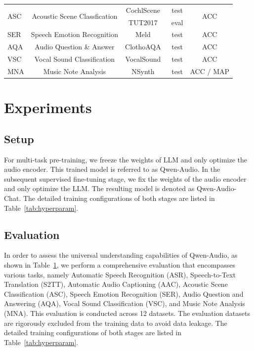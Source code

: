 \documentclass{article}
\begin{document}
\begin{table}[t!]
{\begin{tabular}{lcccc}
\midrule
\multirow{2}{*}{ASC} & \multirow{2}{*}{Acoustic Scene Classfication} & CochlScene~\citep{cochlscene}  &     test        & \multirow{2}{*}{ACC}                    \\
                     &                                               & TUT2017~\citep{TUT2017}     &    eval         &                                         \\\midrule
SER                  & Speech Emotion Recognition                    & Meld~\citep{Meld}        &      test       & ACC                                     \\\midrule
AQA                  & Audio Question \& Answer                      & ClothoAQA~\citep{ClothoAQA}   &     test        & ACC                                     \\\midrule
VSC                  & Vocal Sound Classification                     & VocalSound~\citep{VocalSound}  &    test         & ACC                                     \\\midrule
MNA                  & Music Note Analysis                           & NSynth~\citep{NSynth}      &       test      & ACC / MAP                      \\\bottomrule         
\end{tabular}
}
\label{tab:evaluation}
\end{table}


\section{Experiments}
\label{sec:experiments}
\subsection{Setup}
For multi-task pre-training, we freeze the weights of LLM and only optimize the audio encoder. This trained model is referred to as Qwen-Audio. In the subsequent supervised fine-tuning stage, we fix the weights of the audio encoder and only optimize the LLM. The resulting model is denoted as Qwen-Audio-Chat. The detailed training configurations of both stages are listed in Table~\ref{tab:hyperparam}.


\subsection{Evaluation}

In order to assess the universal understanding capabilities of Qwen-Audio, as shown in Table~\ref{tab:evaluation}, we perform a comprehensive evaluation that encompasses various tasks, namely Automatic Speech Recognition (ASR), Speech-to-Text Translation (S2TT), Automatic Audio Captioning (AAC), Acoustic Scene Classification (ASC), Speech Emotion Recognition (SER), Audio Question and Answering (AQA), Vocal Sound Classification (VSC), and Music Note Analysis (MNA). This evaluation is conducted across 12 datasets. The evaluation datasets are rigorously excluded from the training data to avoid data leakage. The detailed training configurations of both stages are listed in Table~\ref{tab:hyperparam}.
\end{document}
